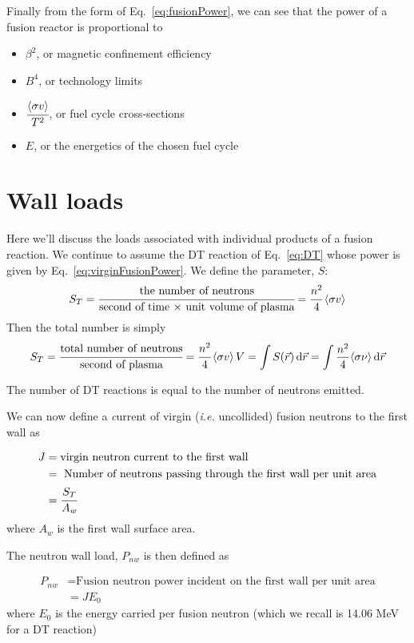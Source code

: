 \documentclass[11pt]{report} %
\begin{document}
Finally from the form of Eq.~\ref{eq:fusionPower}, we can see that the power of a fusion reactor is proportional to 
\begin{itemize}
\item $\beta^2$, or magnetic confinement efficiency 
\item $B^4$, or technology limits
\item $\cfrac{\langle\sigma v\rangle}{T^2}$, or fuel cycle cross-sections
\item $E$, or the energetics of the chosen fuel cycle
\end{itemize} 



\section{Wall loads}
Here we'll discuss the loads associated with individual products of a fusion reaction. We continue to assume the DT reaction of Eq.~\ref{eq:DT} whose power is given by Eq.~\ref{eq:virginFusionPower}. We define the parameter, $S$:
\begin{equation}
S_T =\cfrac{\text{the number of neutrons}}{\text{second of time $\times$ unit volume of plasma}} = \cfrac{n^2}{4}\,\langle\sigma v\rangle
\end{equation}
Then the total number is simply
\begin{equation}
S_T =\cfrac{\text{total number of neutrons}}{\text{second of plasma}} = \cfrac{n^2}{4}\,\langle\sigma v\rangle\, V = \int S(\vec{r})\,\mathrm{d}\vec{r} = \int \frac{n^2}{4}\langle\sigma\nu\rangle\,\mathrm{d}\vec{r}
\end{equation}

The number of DT reactions is equal to the number of neutrons emitted.

We can now define a {\emph current} of virgin ({\it i.e.} uncollided) fusion neutrons to the first wall as

\begin{align}
J & = \text{virgin neutron current to the first wall}\nonumber\\
& = \text{ Number of neutrons passing through the first wall per unit area}\nonumber\\
& = \cfrac{S_T}{A_w}
\end{align}
where $A_w$ is the first wall surface area.

The neutron wall load, $P_{nw}$ is then defined as

\begin{align}
P_{nw} & = \text{Fusion neutron power incident on the first wall per unit area}\nonumber\\
& = JE_0
\end{align}
where $E_0$ is the energy carried per fusion neutron (which we recall is 14.06 MeV for a DT reaction)
\end{document}
